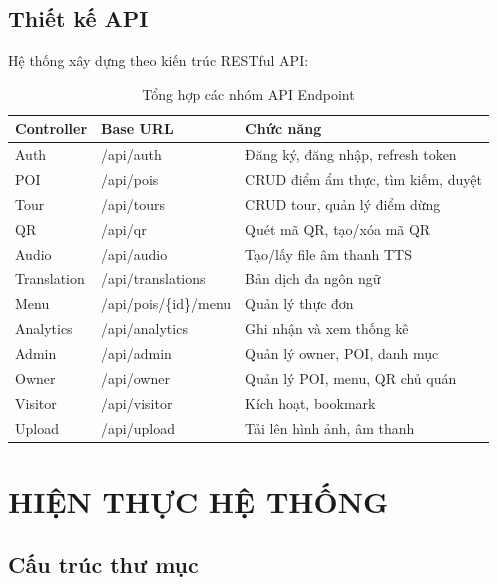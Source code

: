 \documentclass[a4paper,13pt]{report}
\begin{document}
\section{Thiết kế API}

Hệ thống xây dựng theo kiến trúc RESTful API:

\begin{table}[H]
\centering
\caption{Tổng hợp các nhóm API Endpoint}
\begin{tabularx}{\textwidth}{|l|l|X|}
\hline
\textbf{Controller} & \textbf{Base URL} & \textbf{Chức năng} \\
\hline
Auth & /api/auth & Đăng ký, đăng nhập, refresh token \\
\hline
POI & /api/pois & CRUD điểm ẩm thực, tìm kiếm, duyệt \\
\hline
Tour & /api/tours & CRUD tour, quản lý điểm dừng \\
\hline
QR & /api/qr & Quét mã QR, tạo/xóa mã QR \\
\hline
Audio & /api/audio & Tạo/lấy file âm thanh TTS \\
\hline
Translation & /api/translations & Bản dịch đa ngôn ngữ \\
\hline
Menu & /api/pois/\{id\}/menu & Quản lý thực đơn \\
\hline
Analytics & /api/analytics & Ghi nhận và xem thống kê \\
\hline
Admin & /api/admin & Quản lý owner, POI, danh mục \\
\hline
Owner & /api/owner & Quản lý POI, menu, QR chủ quán \\
\hline
Visitor & /api/visitor & Kích hoạt, bookmark \\
\hline
Upload & /api/upload & Tải lên hình ảnh, âm thanh \\
\hline
\end{tabularx}
\end{table}

\chapter{HIỆN THỰC HỆ THỐNG}

\section{Cấu trúc thư mục}
\end{document}
